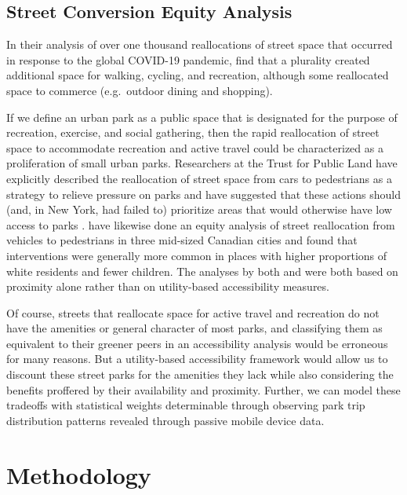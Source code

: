 \documentclass[3p, authoryear, review]{elsarticle} %
\begin{document}
\hypertarget{street-conversion-equity-analysis}{%
\subsection{Street Conversion Equity Analysis}\label{street-conversion-equity-analysis}}

In their analysis of over one thousand reallocations of street space that occurred in response to the global COVID-19 pandemic, \citet{combs2021shifting} find that a plurality created additional space for walking, cycling, and recreation, although some reallocated space to commerce (e.g.~outdoor dining and shopping).

If we define an urban park as a public space that is designated for the purpose of recreation, exercise, and social gathering, then the rapid reallocation of street space to accommodate recreation and active travel could be characterized as a proliferation of small urban parks. Researchers at the Trust for Public Land have explicitly described the reallocation of street space from cars to pedestrians as a strategy to relieve pressure on parks \citep{hussain_parks_2020} and have suggested that these actions should (and, in New York, had failed to) prioritize areas that would otherwise have low access to parks \citep{compton_parks_2020}. \citet{fischer_covid-19_2021} have likewise done an equity analysis of street reallocation from vehicles to pedestrians in three mid-sized Canadian cities and found that interventions were generally more common in places with higher proportions of white residents and fewer children. The analyses by both \citet{compton_parks_2020} and \citet{fischer_covid-19_2021} were both based on proximity alone rather than on utility-based accessibility measures.

Of course, streets that reallocate space for active travel and recreation do not have the amenities or general character of most parks, and classifying them as equivalent to their greener peers in an accessibility analysis would be erroneous for many reasons. But a utility-based accessibility framework would allow us to discount these street parks for the amenities they lack while also considering the benefits proffered by their availability and proximity. Further, we can model these tradeoffs with statistical weights determinable through observing park trip distribution patterns revealed through passive mobile device data.

\hypertarget{methodology}{%
\section{Methodology}\label{methodology}}
\end{document}
